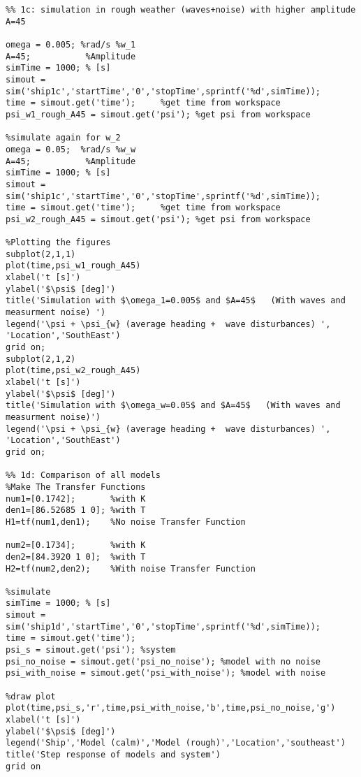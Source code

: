 \begin{lstlisting}
%% 1c: simulation in rough weather (waves+noise) with higher amplitude A=45

omega = 0.005; %rad/s %w_1
A=45;           %Amplitude
simTime = 1000; % [s]
simout = sim('ship1c','startTime','0','stopTime',sprintf('%d',simTime));
time = simout.get('time');     %get time from workspace
psi_w1_rough_A45 = simout.get('psi'); %get psi from workspace

%simulate again for w_2
omega = 0.05;  %rad/s %w_w
A=45;           %Amplitude
simTime = 1000; % [s]
simout = sim('ship1c','startTime','0','stopTime',sprintf('%d',simTime));
time = simout.get('time');     %get time from workspace
psi_w2_rough_A45 = simout.get('psi'); %get psi from workspace

%Plotting the figures
subplot(2,1,1)
plot(time,psi_w1_rough_A45)
xlabel('t [s]')
ylabel('$\psi$ [deg]')
title('Simulation with $\omega_1=0.005$ and $A=45$   (With waves and measurment noise) ')
legend('\psi + \psi_{w} (average heading +  wave disturbances) ', 'Location','SouthEast')
grid on;
subplot(2,1,2)
plot(time,psi_w2_rough_A45)
xlabel('t [s]')
ylabel('$\psi$ [deg]')
title('Simulation with $\omega_w=0.05$ and $A=45$   (With waves and measurment noise)')
legend('\psi + \psi_{w} (average heading +  wave disturbances) ', 'Location','SouthEast')
grid on;

%% 1d: Comparison of all models
%Make The Transfer Functions 
num1=[0.1742];       %with K
den1=[86.52685 1 0]; %with T
H1=tf(num1,den1);    %No noise Transfer Function

num2=[0.1734];       %with K
den2=[84.3920 1 0];  %with T
H2=tf(num2,den2);    %With noise Transfer Function

%simulate
simTime = 1000; % [s]
simout = sim('ship1d','startTime','0','stopTime',sprintf('%d',simTime));
time = simout.get('time');
psi_s = simout.get('psi'); %system
psi_no_noise = simout.get('psi_no_noise'); %model with no noise
psi_with_noise = simout.get('psi_with_noise'); %model with noise

%draw plot
plot(time,psi_s,'r',time,psi_with_noise,'b',time,psi_no_noise,'g')
xlabel('t [s]')
ylabel('$\psi$ [deg]')
legend('Ship','Model (calm)','Model (rough)','Location','southeast')
title('Step response of models and system')
grid on
\end{lstlisting}

